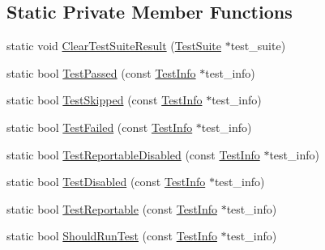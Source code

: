 \subsection*{Static Private Member Functions}
\begin{DoxyCompactItemize}
\item 
static void \hyperlink{classtesting_1_1TestSuite_ac369ed8314da7fc6a322c57e5d5537ed}{Clear\+Test\+Suite\+Result} (\hyperlink{classtesting_1_1TestSuite}{Test\+Suite} $\ast$test\+\_\+suite)
\item 
static bool \hyperlink{classtesting_1_1TestSuite_a30cb6d26a98feda5c2af89a15abd3264}{Test\+Passed} (const \hyperlink{classtesting_1_1TestInfo}{Test\+Info} $\ast$test\+\_\+info)
\item 
static bool \hyperlink{classtesting_1_1TestSuite_a0e162a1f49f40049a5b16fe989dc75e7}{Test\+Skipped} (const \hyperlink{classtesting_1_1TestInfo}{Test\+Info} $\ast$test\+\_\+info)
\item 
static bool \hyperlink{classtesting_1_1TestSuite_ae4a91afa37c495d36bf30dd9d6cf0e9c}{Test\+Failed} (const \hyperlink{classtesting_1_1TestInfo}{Test\+Info} $\ast$test\+\_\+info)
\item 
static bool \hyperlink{classtesting_1_1TestSuite_a6f9748db6f3382f65c747bcc2bc46b4c}{Test\+Reportable\+Disabled} (const \hyperlink{classtesting_1_1TestInfo}{Test\+Info} $\ast$test\+\_\+info)
\item 
static bool \hyperlink{classtesting_1_1TestSuite_a01cf264bd705388df0778160ed433b93}{Test\+Disabled} (const \hyperlink{classtesting_1_1TestInfo}{Test\+Info} $\ast$test\+\_\+info)
\item 
static bool \hyperlink{classtesting_1_1TestSuite_a939aba8925d609fb5d01464edad0b4d7}{Test\+Reportable} (const \hyperlink{classtesting_1_1TestInfo}{Test\+Info} $\ast$test\+\_\+info)
\item 
static bool \hyperlink{classtesting_1_1TestSuite_ad6db30ec4e23a809f398dc2f50008541}{Should\+Run\+Test} (const \hyperlink{classtesting_1_1TestInfo}{Test\+Info} $\ast$test\+\_\+info)
\end{DoxyCompactItemize}
